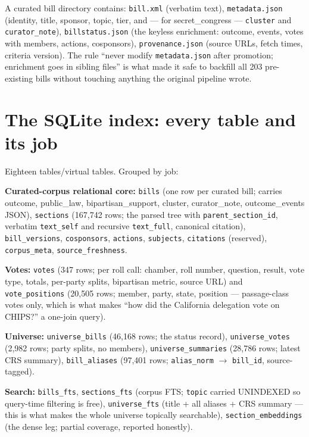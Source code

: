 \documentclass[11pt]{article}
\newcommand{\file}[1]{\texttt{#1}}
\newcommand{\code}[1]{\texttt{#1}}
\begin{document}
A curated bill directory contains: \file{bill.xml} (verbatim text),
\file{metadata.json} (identity, title, sponsor, topic, tier, and --- for
secret\_congress --- \code{cluster} and \code{curator\_note}),
\file{billstatus.json} (the keyless enrichment: outcome, events, votes with
members, actions, cosponsors), \file{provenance.json} (source URLs, fetch
times, criteria version). The rule ``never modify \file{metadata.json} after
promotion; enrichment goes in sibling files'' is what made it safe to backfill
all 203 pre-existing bills without touching anything the original pipeline
wrote.

\section{The SQLite index: every table and its job}
\label{sec:sqlite}

Eighteen tables/virtual tables. Grouped by job:

\textbf{Curated-corpus relational core:} \code{bills} (one row per curated
bill; carries outcome, public\_law, bipartisan\_support, cluster,
curator\_note, outcome\_events JSON), \code{sections} (167{,}742 rows; the
parsed tree with \code{parent\_section\_id}, verbatim \code{text\_self} and
recursive \code{text\_full}, canonical citation), \code{bill\_versions},
\code{cosponsors}, \code{actions}, \code{subjects}, \code{citations}
(reserved), \code{corpus\_meta}, \code{source\_freshness}.

\textbf{Votes:} \code{votes} (347 rows; per roll call: chamber, roll number,
question, result, vote type, totals, per-party splits, bipartisan metric,
source URL) and \code{vote\_positions} (20{,}505 rows; member, party, state,
position --- passage-class votes only, which is what makes ``how did the
California delegation vote on CHIPS?'' a one-join query).

\textbf{Universe:} \code{universe\_bills} (46{,}168 rows; the status record),
\code{universe\_votes} (2{,}982 rows; party splits, no members),
\code{universe\_summaries} (28{,}786 rows; latest CRS summary),
\code{bill\_aliases} (97{,}401 rows; \code{alias\_norm} $\to$
\code{bill\_id}, source-tagged).

\textbf{Search:} \code{bills\_fts}, \code{sections\_fts} (corpus FTS;
\code{topic} carried UNINDEXED so query-time filtering is free),
\code{universe\_fts} (title + all aliases + CRS summary --- this is what
makes the whole universe topically searchable), \code{section\_embeddings}
(the dense leg; partial coverage, reported honestly).
\end{document}
